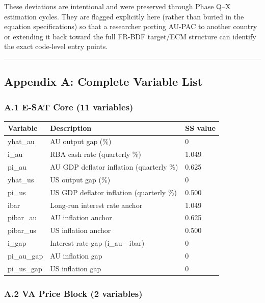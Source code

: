 \documentclass[
]{article}
\newcounter{none} %
\begin{document}
These deviations are intentional and were preserved through Phase Q--X
estimation cycles. They are flagged explicitly here (rather than buried
in the equation specifications) so that a researcher porting AU-PAC to
another country or extending it back toward the full FR-BDF target/ECM
structure can identify the exact code-level entry points.

\begin{center}\rule{0.5\linewidth}{0.5pt}\end{center}

\subsection{Appendix A: Complete Variable
List}\label{appendix-a-complete-variable-list}

\subsubsection{A.1 E-SAT Core (11
variables)}\label{a.1-e-sat-core-11-variables}

{\def\LTcaptype{none} %
\begin{longtable}[]{@{}lll@{}}
\toprule\noalign{}
Variable & Description & SS value \\
\midrule\noalign{}
\endhead
\bottomrule\noalign{}
\endlastfoot
yhat\_au & AU output gap (\%) & 0 \\
i\_au & RBA cash rate (quarterly \%) & 1.049 \\
pi\_au & AU GDP deflator inflation (quarterly \%) & 0.625 \\
yhat\_us & US output gap (\%) & 0 \\
pi\_us & US GDP deflator inflation (quarterly \%) & 0.500 \\
ibar & Long-run interest rate anchor & 1.049 \\
pibar\_au & AU inflation anchor & 0.625 \\
pibar\_us & US inflation anchor & 0.500 \\
i\_gap & Interest rate gap (i\_au - ibar) & 0 \\
pi\_au\_gap & AU inflation gap & 0 \\
pi\_us\_gap & US inflation gap & 0 \\
\end{longtable}
}

\subsubsection{A.2 VA Price Block (2
variables)}\label{a.2-va-price-block-2-variables}
\end{document}
